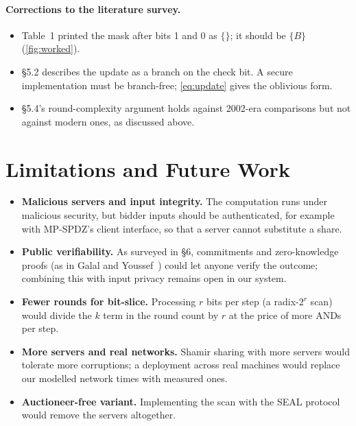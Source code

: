 \documentclass[11pt,a4paper]{article}
\begin{document}
\paragraph{Corrections to the literature survey.}
\begin{itemize}
  \item Table~1 printed the mask after bits 1 and 0 as $\{\}$; it should be $\{B\}$
        (\cref{fig:worked}).
  \item \S5.2 describes the update as a branch on the check bit. A secure implementation must be
        branch-free; \cref{eq:update} gives the oblivious form.
  \item \S5.4's round-complexity argument holds against 2002-era comparisons but not against
        modern ones, as discussed above.
\end{itemize}

\section{Limitations and Future Work}

\begin{itemize}
  \item \textbf{Malicious servers and input integrity.} The computation runs under malicious
        security, but bidder inputs should be authenticated, for example with MP-SPDZ's client
        interface, so that a server cannot substitute a share.
  \item \textbf{Public verifiability.} As surveyed in \S6, commitments and zero-knowledge proofs
        (as in Galal and Youssef~\cite{galal}) could let anyone verify the outcome; combining this
        with input privacy remains open in our system.
  \item \textbf{Fewer rounds for bit-slice.} Processing $r$ bits per step (a radix-$2^r$ scan)
        would divide the $k$ term in the round count by $r$ at the price of more ANDs per step.
  \item \textbf{More servers and real networks.} Shamir sharing with more servers would tolerate
        more corruptions; a deployment across real machines would replace our modelled network
        times with measured ones.
  \item \textbf{Auctioneer-free variant.} Implementing the scan with the SEAL protocol~\cite{seal}
        would remove the servers altogether.
\end{itemize}
\end{document}
